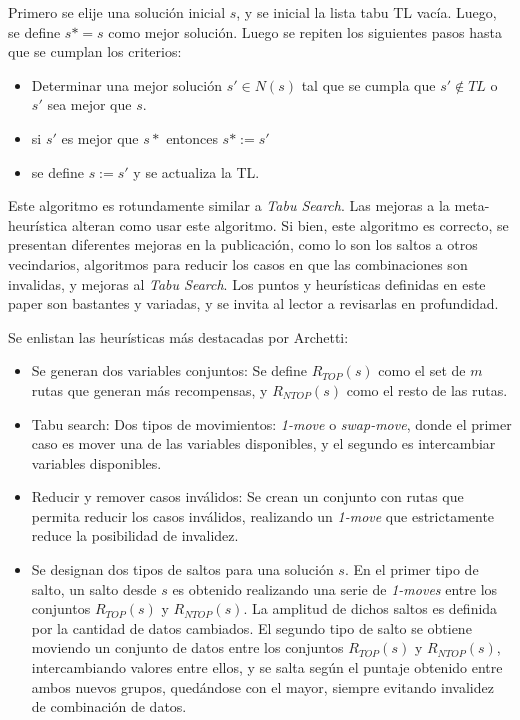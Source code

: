 \documentclass[letter, 10pt]{article}
\begin{document}
Primero se elije una solución inicial $s$, y se inicial la lista tabu TL vacía. Luego, se define $s* = s$ como mejor solución.
Luego se repiten los siguientes pasos hasta que se cumplan los criterios:
\begin{itemize}
    \item Determinar una mejor solución $s' \in N(s)$ tal que se cumpla que $s' \not\in TL$ o $s'$ sea mejor que $s$.
    \item si $s'$ es mejor que $s*$ entonces $s* := s'$
    \item se define $s := s'$ y se actualiza la TL.
\end{itemize}

Este algoritmo es rotundamente similar a \textit{Tabu Search}. Las mejoras a la meta-heurística alteran como usar este algoritmo. Si bien, este algoritmo es correcto, se presentan diferentes mejoras en la publicación, como lo son los saltos a otros vecindarios, algoritmos para reducir los casos en que las combinaciones son invalidas, y mejoras al \textit{Tabu Search}. Los puntos y heurísticas definidas en este paper \cite{Archetti2007} son bastantes y variadas, y se invita al lector a revisarlas en profundidad.

Se enlistan las heurísticas más destacadas por Archetti:
\begin{itemize}
    \item Se generan dos variables conjuntos: Se define $R_{TOP} (s)$ como el set de $m$ rutas que generan más recompensas, y $R_{NTOP} (s)$ como el resto de las rutas.
    \item Tabu search: Dos tipos de movimientos: \textit{1-move} o \textit{swap-move}, donde el primer caso es mover una de las variables disponibles, y el segundo es intercambiar variables disponibles. 
    \item Reducir y remover casos inválidos: Se crean un conjunto con rutas que permita reducir los casos inválidos, realizando un \textit{1-move} que estrictamente reduce la posibilidad de invalidez.
    \item Se designan dos tipos de saltos para una solución $s$. En el primer tipo de salto, un salto desde $s$ es obtenido realizando una serie de \textit{1-moves} entre los conjuntos $R_{TOP} (s)$ y $R_{NTOP} (s)$. La amplitud de dichos saltos es definida por la cantidad de datos cambiados.  El segundo tipo de salto se obtiene moviendo un conjunto de datos entre los conjuntos $R_{TOP} (s)$ y $R_{NTOP} (s)$, intercambiando valores entre ellos, y se salta según el puntaje obtenido entre ambos nuevos grupos, quedándose con el mayor, siempre evitando invalidez de combinación de datos.
\end{itemize}
\end{document}
